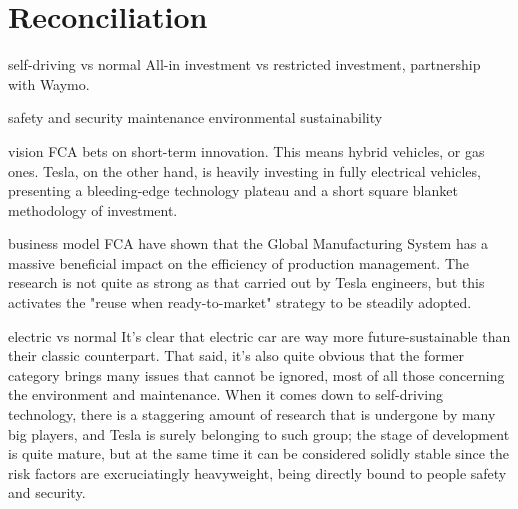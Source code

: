 
\section{Reconciliation}


self-driving vs normal
    All-in investment vs restricted investment, partnership with Waymo.

safety and security
maintenance
environmental sustainability


vision
    FCA bets on short-term innovation. This means hybrid vehicles, or gas ones. Tesla, on the other hand, is heavily investing in fully electrical vehicles, presenting a bleeding-edge technology plateau and a short square blanket methodology of investment.
    
business model
    FCA have shown that the Global Manufacturing System has a massive beneficial impact on the efficiency of production management. The research is not quite as strong as that carried out by Tesla engineers, but this activates the "reuse when ready-to-market" strategy to be steadily adopted.
    
electric vs normal
    It's clear that electric car are way more future-sustainable than their classic counterpart. That said, it's also quite obvious that the former category brings many issues that cannot be ignored, most of all those concerning the environment and maintenance. When it comes down to self-driving technology, there is a staggering amount of research that is undergone by many big players, and Tesla is surely belonging to such group; the stage of development is quite mature, but at the same time it can be considered solidly stable since the risk factors are excruciatingly heavyweight, being directly bound to people safety and security.
    
